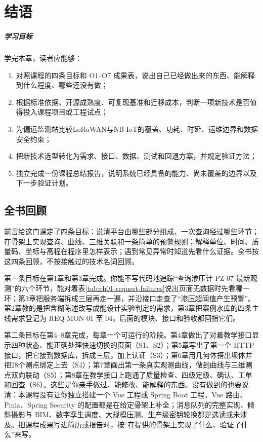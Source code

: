\chapter{结语}\label{ch:conclusion}

\paragraph*{学习目标}

学完本章，读者应能够：

\begin{enumerate}
\item 对照课程的四条目标和 O1--O7 成果表，说出自己已经做出来的东西、能解释到什么程度、哪些还没有做；
\item 根据标准依据、开源成熟度、可复现基准和迁移成本，判断一项新技术是否值得投入课程项目或工程试点；
\item 为偏远监测站比较LoRaWAN与NB-IoT的覆盖、功耗、时延、运维边界和数据安全约束；
\item 把新技术选型转化为需求、接口、数据、测试和回退方案，并规定验证方法；
\item 独立完成一份课程总结报告，说明系统已经具备的能力、尚未覆盖的边界以及下一步验证计划。
\end{enumerate}

\section{全书回顾}

前言给这门课定了四条目标：说清平台由哪些部分组成、一次查询经过哪些环节；在骨架上实现查询、曲线、三维关联和一条简单的预警规则；解释单位、时间、质量码、坐标与高程在程序里怎样表示；遇到常见异常时知道先看什么证据。全书按这四条回顾，不按接触过的技术名词回顾。

第一条目标在第1章和第3章完成。你能不写代码地追踪“查询渗压计 PZ-07 最新观测”的六个环节，能对着表\ref{tab:ch01-request-failures}说出页面无数据时先看哪一环；第3章把服务端拆成三层再走一遍，并沿接口走查了“渗压超阈值产生预警”。第2章教的是把含糊陈述改写成能设计实验判定的需求，第3章把案例水库的四条主线需求登记为 REQ-MON-01 至 04，后面的模块、接口和验收都回指它们。

第二条目标在第4--8章完成，每章一个可运行的阶段。第4章做出了对着教学接口显示四种状态、能正确处理快速切换的页面（S1、S2）；第5章写出了第一个 HTTP 接口，把它接到数据库，拆成三层，加上认证（S3）；第6章用几何体搭出坝体并把28个测点绑定上去（S4）；第7章画出第一条真实观测曲线，做到曲线与三维测点双向联动（S5）；第8章在教学接口上跑通了质量检查、四级定级、确认、工单和回查（S6）。这些是你亲手做过、能修改、能解释的东西。没有做到的也要说清：本课程没有让你独立搭建一个 Vue 工程或 Spring Boot 工程，Vue 路由、Pinia、Spring Security 的配置都是在给定骨架上补全；消息队列的完整实现、倾斜摄影与 BIM、数字孪生调度、大规模压测、生产级密钥轮换都是选读或未涉及。把课程成果写进简历或报告时，按“在提供的骨架上实现了什么、验证了什么”来写。

